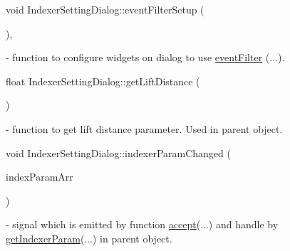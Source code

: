 \mbox{\label{classIndexerSettingDialog_a1843f10a012a547c32953866ecece54b}} 
{\footnotesize\ttfamily void Indexer\+Setting\+Dialog\+::\texorpdfstring{event\+Filter\+Setup}{eventFilterSetup} (\begin{DoxyParamCaption}{ }\end{DoxyParamCaption}){\ttfamily [private]}, {\ttfamily [slot]}} - function to configure widgets on dialog to use \hyperlink{classIndexerSettingDialog_af096cfd78afd37d27487dd383ed30188}{event\+Filter} (...).

\mbox{\label{classIndexerSettingDialog_a436f30e8ab3af6ea4b3a2389c6711fd4}} 
{\footnotesize\ttfamily float Indexer\+Setting\+Dialog\+::\texorpdfstring{get\+Lift\+Distance}{getLiftDistance} (\begin{DoxyParamCaption}{ }\end{DoxyParamCaption})} - function to get lift distance parameter. Used in parent object.

\mbox{\label{classIndexerSettingDialog_a231edf60936e09b15972951f8a7751e7}} 
{\footnotesize\ttfamily void Indexer\+Setting\+Dialog\+::\texorpdfstring{indexer\+Param\+Changed}{indexerParamChanged} (\begin{DoxyParamCaption}\item[{Q\+Byte\+Array}]{index\+Param\+Arr }\end{DoxyParamCaption}){\ttfamily [signal]}} - signal which is emitted by function \hyperlink{classIndexerSettingDialog_a32e867b5d070ed40929837ebc4b45a78}{accept}(...) and handle by \hyperlink{classMainWindow_a5c6f8757a262535d243b6f481ceb570b}{get\+Indexer\+Param}(...) in parent object.

